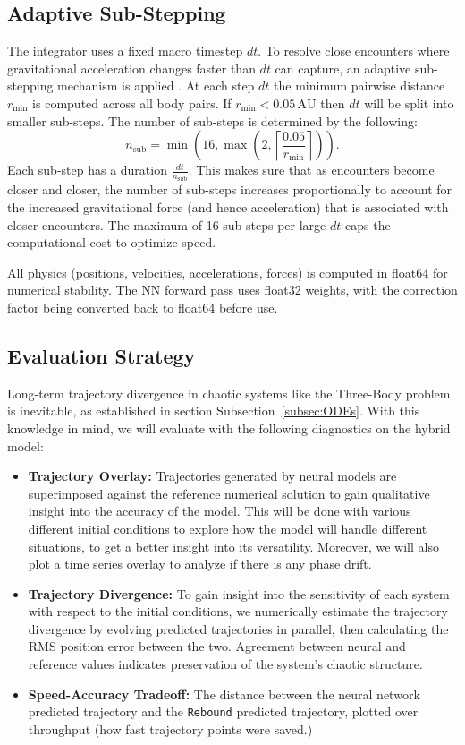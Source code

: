 \documentclass[12pt]{article}
\begin{document}
\subsection{Adaptive Sub-Stepping}
\label{sec:adaptive}
The integrator uses a fixed macro timestep $dt$. To resolve close encounters where gravitational acceleration changes faster than $dt$ can capture, an adaptive sub-stepping mechanism is applied \cite{Rein_2014}. At each step $dt$ the minimum pairwise distance $r_{\min}$ is computed across all body pairs. If $r_{\min} <0.05\,\mathrm{AU}$ then $dt$ will be split into smaller sub-steps. The number of sub-steps is determined by the following:
\[
n_{\mathrm{sub}}=\min\left(16,\max\left(2,\left\lceil \frac{0.05}{r_{\min}}\right\rceil\right)\right).
\]
Each sub-step has a duration $\frac{dt}{n_{\mathrm{sub}}}$. This makes sure that as encounters become closer and closer, the number of sub-steps increases proportionally to account for the increased gravitational force (and hence acceleration) that is associated with closer encounters. The maximum of 16 sub-steps per large $dt$ caps the computational cost to optimize speed.

All physics (positions, velocities, accelerations, forces) is computed in float64 for numerical stability. The NN forward pass uses float32 weights, with the correction factor being converted back to float64 before use.

\subsection{Evaluation Strategy}
\label{sec:evaluation}
Long-term trajectory divergence in chaotic systems like the Three-Body problem is inevitable, as established in section Subsection~\ref{subsec:ODEs}. With this knowledge in mind, we will evaluate with the following diagnostics on the hybrid model:

\begin{itemize}
    \item \textbf{Trajectory Overlay:} Trajectories generated by neural models are superimposed against the reference numerical solution to gain qualitative insight into the accuracy of the model. This will be done with various different initial conditions to explore how the model will handle different situations, to get a better insight into its versatility. Moreover, we will also plot a time series overlay to analyze if there is any phase drift.
    \item \textbf{Trajectory Divergence:} To gain insight into the sensitivity of each system with respect to the initial conditions, we numerically estimate the trajectory divergence by evolving predicted trajectories in parallel, then calculating the RMS position error between the two. Agreement between neural and reference values indicates preservation of the system's chaotic structure.
    \item \textbf{Speed-Accuracy Tradeoff:} The distance between the neural network predicted trajectory and the \texttt{Rebound} predicted trajectory, plotted over throughput (how fast trajectory points were saved.)
\end{itemize}
\end{document}
